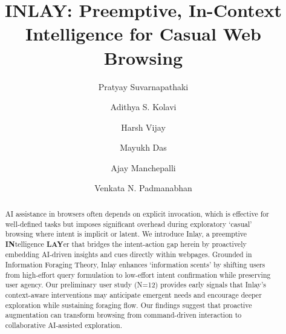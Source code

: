 \documentclass[sigconf]{acmart}
\begin{document}
\title{INLAY: Preemptive, In-Context Intelligence for Casual Web Browsing}

\author{Pratyay Suvarnapathaki}

\author{Adithya S. Kolavi}

\author{Harsh Vijay}

\author{Mayukh Das}

\author{Ajay Manchepalli}

\author{Venkata N. Padmanabhan}
\renewcommand{\shortauthors}{Suvarnapathaki et al.}

\begin{abstract}
AI assistance in browsers often depends on explicit invocation, which is effective for well-defined tasks but imposes significant overhead during exploratory `casual' browsing where intent is implicit or latent. We introduce Inlay, a preemptive \textbf{IN}telligence \textbf{LAY}er that bridges the intent-action gap herein by proactively embedding AI-driven insights and cues directly within webpages. Grounded in Information Foraging Theory, Inlay enhances `information scents' by shifting users from high-effort query formulation to low-effort intent confirmation while preserving user agency. Our preliminary user study (N=12) provides early signals that Inlay's context-aware interventions may anticipate emergent needs and encourage deeper exploration while sustaining foraging flow. Our findings suggest that proactive augmentation can transform browsing from command-driven interaction to collaborative AI-assisted exploration.
\end{abstract}
\end{document}
